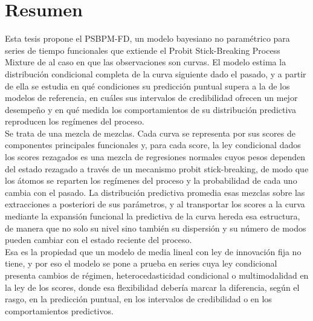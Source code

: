 \chapter*{Resumen}
Esta tesis propone el PSBPM-FD, un modelo bayesiano no paramétrico para series de tiempo funcionales que extiende el Probit Stick-Breaking Process Mixture de \citet{03_02_chung2009nonparametric} al caso en que las observaciones son curvas. El modelo estima la distribución condicional completa de la curva siguiente dado el pasado, y a partir de ella se estudia en qué condiciones su predicción puntual supera a la de los modelos de referencia, en cuáles sus intervalos de credibilidad ofrecen un mejor desempeño y en qué medida los comportamientos de su distribución predictiva reproducen los regímenes del proceso.\\

Se trata de una mezcla de mezclas. Cada curva se representa por sus scores de componentes principales funcionales y, para cada score, la ley condicional dados los scores rezagados es una mezcla de regresiones normales cuyos pesos dependen del estado rezagado a través de un mecanismo probit stick-breaking, de modo que los átomos se reparten los regímenes del proceso y la probabilidad de cada uno cambia con el pasado. La distribución predictiva promedia esas mezclas sobre las extracciones a posteriori de sus parámetros, y al transportar los scores a la curva mediante la expansión funcional la predictiva de la curva hereda esa estructura, de manera que no solo su nivel sino también su dispersión y su número de modos pueden cambiar con el estado reciente del proceso.\\

Esa es la propiedad que un modelo de media lineal con ley de innovación fija no tiene, y por eso el modelo se pone a prueba en series cuya ley condicional presenta cambios de régimen, heterocedasticidad condicional o multimodalidad en la ley de los scores, donde esa flexibilidad debería marcar la diferencia, según el rasgo, en la predicción puntual, en los intervalos de credibilidad o en los comportamientos predictivos.\\